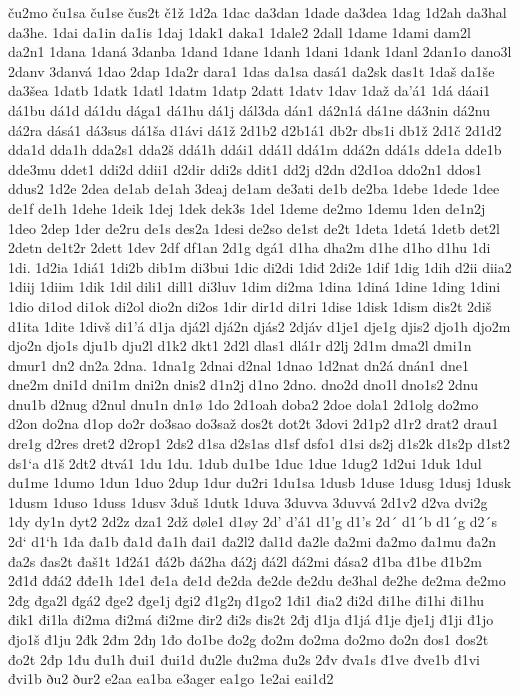 ču2mo
ču1sa
ču1se
čus2t
č1ž
1d2a
1dac
da3dan
1dade
da3dea
1dag
1d2ah
da3hal
da3he.
1dai
da1in
da1is
1daj
1dak1
daka1
1dale2
2dall
1dame
1dami
dam2l
da2n1
1dana
1daná
3danba
1dand
1dane
1danh
1dani
1dank
1danl
2dan1o
dano3l
2danv
3danvá
1dao
2dap
1da2r
dara1
1das
da1sa
dasá1
da2sk
das1t
1daš
da1še
da3šea
1datb
1datk
1datl
1datm
1datp
2datt
1datv
1dav
1daž
da'á1
1dá
dáai1
dá1bu
dá1d
dá1du
dága1
dá1hu
dá1j
dál3da
dán1
dá2n1á
dá1ne
dá3nin
dá2nu
dá2ra
dásá1
dá3sus
dá1ša
d1ávi
dá1ž
2d1b2
d2b1á1
db2r
dbs1i
db1ž
2d1č
2d1d2
dda1d
dda1h
dda2s1
dda2š
ddá1h
ddái1
ddá1l
ddá1m
ddá2n
ddá1s
dde1a
dde1b
dde3mu
ddet1
ddi2d
ddii1
d2dir
ddi2s
ddit1
dd2j
d2dn
d2d1oa
ddo2n1
ddos1
ddus2
1d2e
2dea
de1ab
de1ah
3deaj
de1am
de3ati
de1b
de2ba
1debe
1dede
1dee
de1f
de1h
1dehe
1deik
1dej
1dek
dek3s
1del
1deme
de2mo
1demu
1den
de1n2j
1deo
2dep
1der
de2ru
de1s
des2a
1desi
de2so
de1st
de2t
1deta
1detá
1detb
det2l
2detn
de1t2r
2dett
1dev
2df
df1an
2d1g
dgá1
d1ha
dha2m
d1he
d1ho
d1hu
1di
1di.
1d2ia
1diá1
1di2b
dib1m
di3bui
1dic
di2di
1diđ
2di2e
1dif
1dig
1dih
d2ii
diia2
1diij
1diim
1dik
1dil
dili1
dill1
di3luv
1dim
di2ma
1dina
1diná
1dine
1ding
1dini
1dio
di1od
di1ok
di2ol
dio2n
di2os
1dir
dir1d
di1ri
1dise
1disk
1dism
dis2t
2diš
d1ita
1dite
1divš
di1'á
d1ja
djá2l
djá2n
djás2
2djáv
d1je1
dje1g
djis2
djo1h
djo2m
djo2n
djo1s
dju1b
dju2l
d1k2
dkt1
2d2l
dlas1
dlá1r
d2lj
2d1m
dma2l
dmi1n
dmur1
dn2
dn2a
2dna.
1dna1g
2dnai
d2nal
1dnao
1d2nat
dn2á
dnán1
dne1
dne2m
dni1d
dni1m
dni2n
dnis2
d1n2j
d1no
2dno.
dno2d
dno1l
dno1s2
2dnu
dnu1b
d2nug
d2nul
dnu1n
dn1ø
1do
2d1oah
doba2
2doe
dola1
2d1olg
do2mo
d2on
do2na
d1op
do2r
do3sao
do3saž
dos2t
dot2t
3dovi
2d1p2
d1r2
drat2
drau1
dre1g
d2res
dret2
d2rop1
2ds2
d1sa
d2s1as
d1sf
dsfo1
d1si
ds2j
d1s2k
d1s2p
d1st2
ds1`a
d1š
2dt2
dtvá1
1du
1du.
1dub
du1be
1duc
1due
1dug2
1d2ui
1duk
1dul
du1me
1dumo
1dun
1duo
2dup
1dur
du2ri
1du1sa
1dusb
1duse
1dusg
1dusj
1dusk
1dusm
1duso
1duss
1dusv
3duš
1dutk
1duva
3duvva
3duvvá
2d1v2
d2va
dvi2g
1dy
dy1n
dyt2
2d2z
dza1
2dž
døle1
d1øy
2d'
d'á1
d1'g
d1's
2d´
d1´b
d1´g
d2´s
2d`
d1`h
1đa
đa1b
đa1d
đa1h
đai1
đa2l2
đal1d
đa2le
đa2mi
đa2mo
đa1mu
đa2n
đa2s
đas2t
đaš1t
1đ2á1
đá2b
đá2ha
đá2j
đá2l
đá2mi
đása2
đ1ba
đ1be
đ1b2m
2đ1đ
đđá2
đđe1h
1đe1
đe1a
đe1d
đe2da
đe2de
đe2du
đe3hal
đe2he
đe2ma
đe2mo
2đg
đga2l
đgá2
đge2
đge1j
đgi2
đ1g2ŋ
đ1go2
1đi1
đia2
đi2d
đi1he
đi1hi
đi1hu
đik1
đi1la
đi2ma
đi2má
đi2me
đir2
đi2s
đis2t
2đj
đ1ja
đ1já
đ1je
đje1j
đ1ji
đ1jo
đjo1š
đ1ju
2đk
2đm
2đŋ
1đo
đo1be
đo2g
đo2m
đo2ma
đo2mo
đo2n
đos1
đos2t
đo2t
2đp
1đu
đu1h
đui1
đui1d
đu2le
đu2ma
đu2s
2đv
đva1s
đ1ve
đve1b
đ1vi
đvi1b
ðu2
ður2
e2aa
ea1ba
e3ager
ea1go
1e2ai
eai1d2
